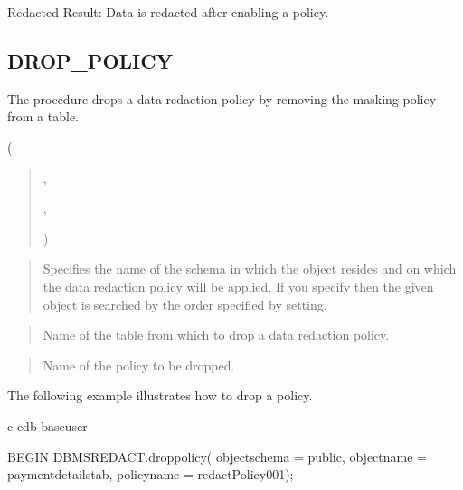 \documentclass[letterpaper,10pt,english,openany,oneside]{sphinxmanual}
\begin{document}
Redacted Result: Data is redacted after enabling a policy.

\newpage

\ignorespaces 

\subsection{DROP\_POLICY}
\label{\detokenize{dbms_redact:drop-policy}}\label{\detokenize{dbms_redact:index-6}}
The  procedure drops a data redaction policy by removing the
masking policy from a table.

 (
\begin{quote}

,

,


)
\end{quote}


\begin{quote}

Specifies the name of the schema in which the object resides and on
which the data redaction policy will be applied. If you specify 
then the given object is searched by the order specified by 
setting.
\end{quote}

\begin{quote}

Name of the table from which to drop a data redaction policy.
\end{quote}

\begin{quote}

Name of the policy to be dropped.
\end{quote}


The following example illustrates how to drop a policy.

%
\begin{sphinxVerbatim}[commandchars=\\\{\}]
\PYGZbs{}c edb base\PYGZus{}user

BEGIN
  DBMS\PYGZus{}REDACT.drop\PYGZus{}policy(
    object\PYGZus{}schema =\PYGZgt{} \PYGZsq{}public\PYGZsq{},
    object\PYGZus{}name =\PYGZgt{} \PYGZsq{}payment\PYGZus{}details\PYGZus{}tab\PYGZsq{},
    policy\PYGZus{}name =\PYGZgt{} \PYGZsq{}redactPolicy\PYGZus{}001\PYGZsq{});
\end{sphinxVerbatim}
\end{document}
